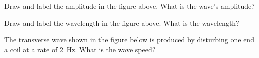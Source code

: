 \documentclass[answers]{exam}
\begin{document}
\begin{questions}

\question \label{Q1}
Draw and label the amplitude in the figure above. What is the wave's amplitude? \fillin[\SI{4}{m}][3cm]


\question \label{Q2}
Draw and label the wavelength in the figure above. What is the wavelength? \fillin[\SI{8}{m}][3cm]







\question 
The transverse wave shown in the figure below is produced by disturbing one end a coil at a rate of \SI{2}{Hz}. What is the wave speed?

\begin{center}
\end{center}


\end{questions}
\end{document}
